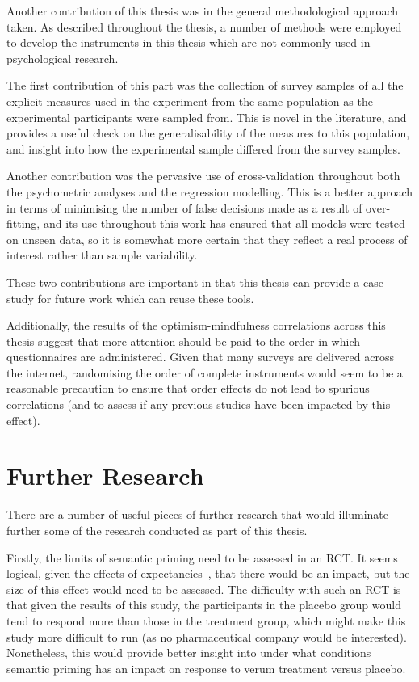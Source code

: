 Another contribution of this thesis was in the general methodological
approach taken. As described throughout the thesis, a number of
methods were employed to develop the instruments in this thesis which
are not commonly used in psychological research.

The first contribution of this part was the collection of survey
samples of all the explicit measures used in the experiment from the
same population as the experimental participants were sampled from.
This is novel in the literature, and provides a useful check on the
generalisability of the measures to this population, and insight into
how the experimental sample differed from the survey samples.

Another contribution was the pervasive use of cross-validation
throughout both the psychometric analyses and the regression
modelling. This is a better approach in terms of minimising the number
of false decisions made as a result of over-fitting, and its use
throughout this work has ensured that all models were tested on unseen
data, so it is somewhat more certain that they reflect a real process
of interest rather than sample variability.

These two contributions are important in that this thesis can provide
a case study for future work which can reuse these tools.

Additionally, the results of the optimism-mindfulness correlations
across this thesis suggest that more attention should be paid to the
order in which questionnaires are administered. Given that many
surveys are delivered across the internet, randomising the order of
complete instruments would seem to be a reasonable precaution to
ensure that order effects do not lead to spurious correlations (and to
assess if any previous studies have been impacted by this effect).

\section{Further Research}
\label{sec:further-research}

There are a number of useful pieces of further research that would
illuminate further some of the research conducted as part of this
thesis.

Firstly, the limits of semantic priming need to be assessed in an RCT.
It seems logical, given the effects of
expectancies~\cite{Bausell2005}, that there would be an impact, but
the size of this effect would need to be assessed. The difficulty with
such an RCT is that given the results of this study, the participants
in the placebo group would tend to respond more than those in the
treatment group, which might make this study more difficult to run (as
no pharmaceutical company would be interested). Nonetheless, this
would provide better insight into under what conditions semantic
priming has an impact on response to verum treatment versus placebo.

